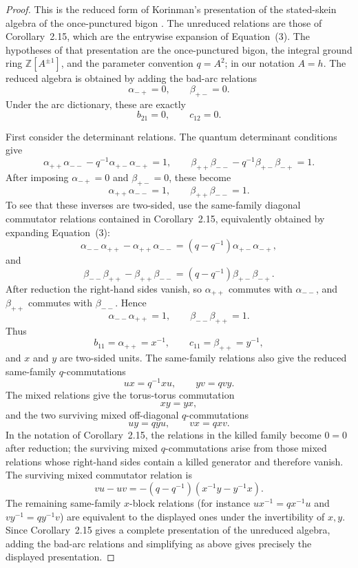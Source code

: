 \documentclass[12pt]{article}
\theoremstyle{plain}
\theoremstyle{definition}
\numberwithin{equation}{section}
\begin{document}
\begin{proof}
This is the reduced form of Korinman's presentation of the stated-skein algebra of the once-punctured bigon \cite{Korinman}.  The unreduced relations are those of Corollary~2.15, which are the entrywise expansion of Equation~(3).  The hypotheses of that presentation are the once-punctured bigon, the integral ground ring \(\mathbb Z[A^{\pm1}]\), and the parameter convention \(q=A^2\); in our notation \(A=h\).  The reduced algebra is obtained by adding the bad-arc relations
\[
\alpha_{-+}=0,
\qquad
\beta_{+-}=0.
\]
Under the arc dictionary, these are exactly
\[
b_{21}=0,
\qquad
c_{12}=0.
\]

First consider the determinant relations.  The quantum determinant conditions give
\[
\alpha_{++}\alpha_{--}-q^{-1}\alpha_{+-}\alpha_{-+}=1,
\qquad
\beta_{++}\beta_{--}-q^{-1}\beta_{+-}\beta_{-+}=1.
\]
After imposing \(\alpha_{-+}=0\) and \(\beta_{+-}=0\), these become
\[
\alpha_{++}\alpha_{--}=1,
\qquad
\beta_{++}\beta_{--}=1.
\]
To see that these inverses are two-sided, use the same-family diagonal commutator relations contained in Corollary~2.15, equivalently obtained by expanding Equation~(3):
\[
\alpha_{--}\alpha_{++}-\alpha_{++}\alpha_{--}
=
(q-q^{-1})\alpha_{+-}\alpha_{-+},
\]
and
\[
\beta_{--}\beta_{++}-\beta_{++}\beta_{--}
=
(q-q^{-1})\beta_{+-}\beta_{-+}.
\]
After reduction the right-hand sides vanish, so \(\alpha_{++}\) commutes with \(\alpha_{--}\), and \(\beta_{++}\) commutes with \(\beta_{--}\).  Hence
\[
\alpha_{--}\alpha_{++}=1,
\qquad
\beta_{--}\beta_{++}=1.
\]
Thus
\[
b_{11}=\alpha_{++}=x^{-1},
\qquad
c_{11}=\beta_{++}=y^{-1},
\]
and \(x\) and \(y\) are two-sided units.
The same-family relations also give the reduced same-family \(q\)-commutations
\[
u x=q^{-1}x u,
\qquad
y v=q v y.
\]
The mixed relations give the torus-torus commutation
\[
xy=yx,
\]
and the two surviving mixed off-diagonal \(q\)-commutations
\[
u y=q y u,
\qquad
v x=q x v.
\]
In the notation of Corollary~2.15, the relations in the killed family become \(0=0\) after reduction; the surviving mixed \(q\)-commutations arise from those mixed relations whose right-hand sides contain a killed generator and therefore vanish.  The surviving mixed commutator relation is
\[
v u-u v=-(q-q^{-1})(x^{-1}y-y^{-1}x).
\]
The remaining same-family \(x\)-block relations (for instance \(u x^{-1}=q x^{-1}u\) and \(v y^{-1}=q y^{-1}v\)) are equivalent to the displayed ones under the invertibility of \(x,y\).  Since Corollary~2.15 gives a complete presentation of the unreduced algebra, adding the bad-arc relations and simplifying as above gives precisely the displayed presentation.
\end{proof}
\end{document}
